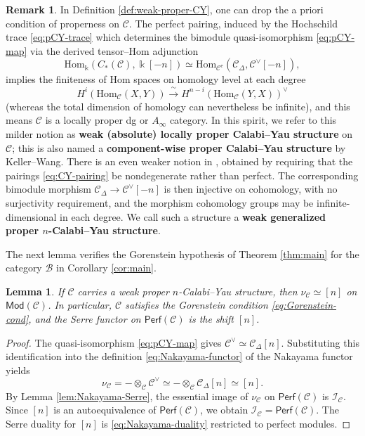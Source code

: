 \documentclass[11pt,letterpaper,reqno]{amsart}
\theoremstyle{plain}
\newtheorem{lemma}[lemma]{Lemma}
\theoremstyle{definition}
\newtheorem{remark}[remark]{Remark}
\theoremstyle{plain}
\theoremstyle{definition}
\numberwithin{equation}{section}
\begin{document}
\begin{remark}\label{rem:CY-finiteness}
In Definition \ref{def:weak-proper-CY}, one can drop the a priori condition of properness on $\mathscr{C}$. The perfect pairing, induced by the Hochschild trace \eqref{eq:pCY-trace} which determines the bimodule quasi-isomorphism \eqref{eq:pCY-map} via the derived tensor--Hom adjunction
\[
\mathrm{Hom}_{\Bbbk}(C_*(\mathscr{C}),\Bbbk[-n])\simeq \mathrm{Hom}_{\mathscr{C}^{\mathrm{e}}}(\mathscr{C}_{\Delta},\mathscr{C}^\vee[-n]),
\]
implies the finiteness of Hom spaces on homology level at each degree 
\[
H^i(\mathrm{Hom}_{\mathscr{C}}(X,Y))\xrightarrow{\;\sim\;}H^{n-i}(\mathrm{Hom}_{\mathscr{C}}(Y,X))^\vee
\]
(whereas the total dimension of homology can nevertheless be infinite), and this means $\mathscr{C}$ is a locally proper dg or $A_\infty$ category. In this spirit, we refer to this milder notion as \textbf{weak (absolute) locally proper Calabi--Yau structure} on $\mathscr{C}$; this is also named a \textbf{component-wise proper Calabi--Yau structure} by Keller--Wang.
There is an even weaker notion in \cite[Definition 2.27]{Gao2025}, obtained by requiring that the pairings \eqref{eq:CY-pairing} be nondegenerate rather than perfect.
The corresponding bimodule morphism $\mathscr{C}_{\Delta}\to\mathscr{C}^\vee[-n]$ is then injective on cohomology, with no surjectivity requirement, and the morphism cohomology groups may be infinite-dimensional in each degree.
We call such a structure a \textbf{weak generalized proper $n$-Calabi--Yau structure}.
\end{remark} 

The next lemma verifies the Gorenstein hypothesis of Theorem \ref{thm:main} for the category $\mathscr B$ in Corollary \ref{cor:main}.

\begin{lemma}\label{lem:pCY-Gorenstein}
If $\mathscr C$ carries a weak proper $n$-Calabi--Yau structure, then $\nu_{\mathscr C}\simeq[n]$ on $\mathsf{Mod}(\mathscr C)$.
In particular, $\mathscr C$ satisfies the Gorenstein condition \eqref{eq:Gorenstein-cond}, and the Serre functor on $\mathsf{Perf}(\mathscr C)$ is the shift $[n]$.
\end{lemma}
\begin{proof}
The quasi-isomorphism \eqref{eq:pCY-map} gives $\mathscr C^\vee\simeq\mathscr C_\Delta[n]$.
Substituting this identification into the definition \eqref{eq:Nakayama-functor} of the Nakayama functor yields
\[
\nu_{\mathscr C}
=-\otimes_{\mathscr C} \mathscr C^\vee
\simeq-\otimes_{\mathscr C} \mathscr C_\Delta[n]
\simeq[n].
\]
By Lemma \ref{lem:Nakayama-Serre}, the essential image of $\nu_{\mathscr C}$ on $\mathsf{Perf}(\mathscr C)$ is $\mathscr I_{\mathscr C}$.
Since $[n]$ is an autoequivalence of $\mathsf{Perf}(\mathscr C)$, we obtain $\mathscr I_{\mathscr C}=\mathsf{Perf}(\mathscr C)$.
The Serre duality for $[n]$ is \eqref{eq:Nakayama-duality} restricted to perfect modules.
\end{proof}
\end{document}
